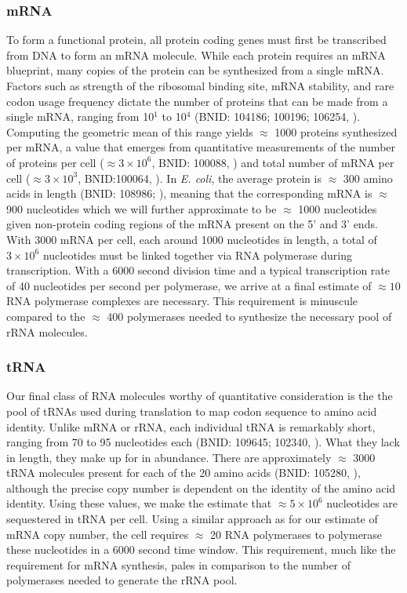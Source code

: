 \subsubsection{mRNA}
To form a functional protein, all protein coding genes must first be
transcribed from DNA to form an mRNA molecule. While each protein requires an
mRNA blueprint, many copies of the protein can be synthesized from a single
mRNA. Factors such as strength of the ribosomal binding site, mRNA stability,
and rare codon usage frequency dictate the number of proteins that can be
made from a single mRNA, ranging from 10$^1$ to 10$^4$ (BNID: 104186; 100196;
106254, \cite{milo2010}). Computing the geometric mean of this range yields
$\approx$ 1000 proteins synthesized per mRNA, a value that emerges from
quantitative measurements of the number of proteins per cell ($\approx 3
\times 10^6$, BNID: 100088, \cite{milo2010}) and total number of mRNA per
cell ($\approx 3 \times 10^3$, BNID:100064, \cite{milo2010}). In \textit{E.
coli}, the average protein is $\approx$ 300 amino acids in length (BNID:
108986; \cite{milo2010}), meaning that the corresponding mRNA is $\approx$
900 nucleotides which we will further approximate to be $\approx$ 1000
nucleotides given non-protein coding regions of the mRNA present on the 5'
and 3' ends. With 3000 mRNA per cell, each around 1000 nucleotides in length,
a total of $3 \times 10^6$ nucleotides must be linked together via RNA
polymerase during transcription. With a 6000 second division time and a
typical transcription rate of 40 nucleotides per second per polymerase, we
arrive at a final estimate of $\approx 10$ RNA polymerase complexes are
necessary. This requirement is minuscule compared to the $\approx$ 400
polymerases needed to synthesize the necessary pool of rRNA molecules.

\subsubsection{tRNA}
Our final class of RNA molecules worthy of quantitative consideration is the
the pool of tRNAs used during translation to map codon sequence to amino acid
identity. Unlike mRNA or rRNA, each individual tRNA is remarkably short,
ranging from 70 to 95 nucleotides each (BNID: 109645; 102340,
\cite{milo2010}). What they lack in length, they make up for in abundance.
There are approximately $\approx$ 3000 tRNA molecules present for each of the
20 amino acids (BNID: 105280, \cite{milo2010}), although the precise copy
number is dependent on the identity of the amino acid identity.  Using these
values, we make the estimate that $\approx 5 \times 10^6$ nucleotides are
sequestered in tRNA per cell. Using a similar approach as for our estimate of
mRNA copy number, the cell requires $\approx$ 20 RNA polymerases to polymerase
these nucleotides in a 6000 second time window. This requirement, much like the
requirement for mRNA synthesis, pales in comparison to the number of polymerases
needed to generate the rRNA pool.

